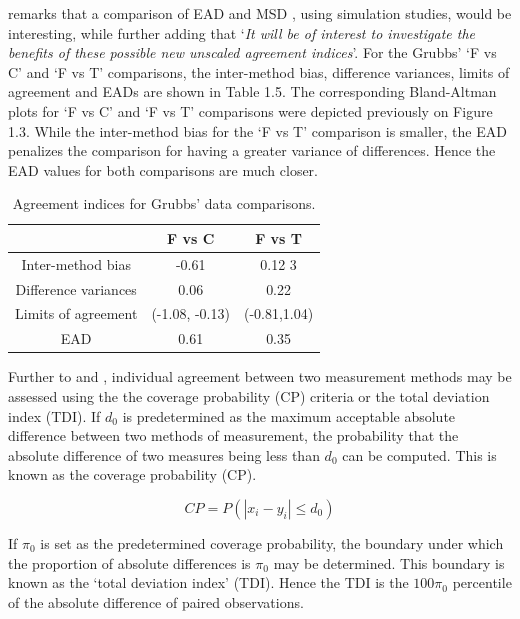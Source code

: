 \documentclass[12pt, a4paper]{report}
\theoremstyle{plain}
\theoremstyle{definition}
\theoremstyle{remark}
\begin{document}
	\citet{Barnhart} remarks that a comparison of EAD and MSD , using
	simulation studies, would be interesting, while further adding
	that `\textit{It will be of interest to investigate the benefits of these
	possible new unscaled agreement indices}'. For the Grubbs' `F vs C' and `F vs T' comparisons, the inter-method bias, difference variances, limits of agreement and EADs are shown
	in Table 1.5. The corresponding Bland-Altman plots for `F vs C' and `F vs T' comparisons were depicted previously on Figure 1.3. While the inter-method bias for the `F vs T' comparison is smaller, the EAD penalizes the comparison for having a greater variance of differences. Hence the EAD values for both comparisons are much closer.
	\begin{table}[ht]
		\begin{center}
			\begin{tabular}{|c|c|c|}
				\hline
				& F vs C & F vs T  \\
				\hline
				Inter-method bias & -0.61 & 0.12 3 \\
				Difference variances & 0.06 & 0.22  \\
				Limits of agreement & (-1.08,	-0.13) & (-0.81,1.04) \\
				EAD & 0.61 & 0.35  \\
				\hline
			\end{tabular}
			\caption{Agreement indices for Grubbs' data comparisons.}
		\end{center}
	\end{table}
	
	Further to  \citet{lin2000} and \citet{lin2002}, individual agreement between two measurement methods may be
	assessed using the the coverage probability (CP) criteria or the total deviation index (TDI). If $d_{0}$ is predetermined as the maximum acceptable absolute difference between two methods of measurement, the probability that the absolute difference of two measures being less than $d_{0}$ can be computed. This is known as the coverage probability (CP).
	
	\begin{equation}
	CP = P(|x_{i} - y_{i}| \leq d_{0})
	\end{equation}
	
	If $\pi_{0}$ is set as the predetermined coverage probability, the
	boundary under which the proportion of absolute differences is
	$\pi_{0}$ may be determined. This boundary is known as the `total
	deviation index' (TDI). Hence the TDI is the $100\pi_{0}$
	percentile of the absolute difference of paired observations.
	
\end{document}
